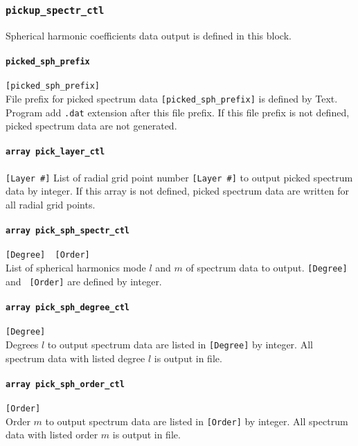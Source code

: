 %
\subsubsection{\tt pickup\_spectr\_ctl}
\label{href_t:pickup_spectr_ctl}
Spherical harmonic coefficients data output is defined in this block.

\paragraph{\tt picked\_sph\_prefix}
\label{href_t:picked_sph_prefix}
\verb|[picked_sph_prefix]| \\
File prefix for picked spectrum data \verb|[picked_sph_prefix]| is defined by Text. Program add {\tt .dat} extension after this file prefix. If this file prefix is not defined, picked spectrum data are not generated. 

\paragraph{\tt array pick\_layer\_ctl}
\label{href_t:pick_layer_ctl}
\verb|[Layer #]|
List of radial grid point number \verb|[Layer #]| to output picked spectrum data by integer. If this array is not defined, picked spectrum data are written for all radial grid points.

\paragraph{\tt array pick\_sph\_spectr\_ctl}
\label{href_t:pick_sph_spectr_ctl}
\verb|[Degree]  [Order]| \\
List of spherical harmonics mode $l$ and $m$ of spectrum data to output. \verb|[Degree]| and \verb| [Order]| are defined by integer.

\paragraph{\tt array pick\_sph\_degree\_ctl}
\label{href_t:pick_sph_degree_ctl}
\verb|[Degree]| \\
Degrees $l$ to output spectrum data are listed in \verb|[Degree]| by integer. All spectrum data with listed degree $l$ is output in file.

\paragraph{\tt array pick\_sph\_order\_ctl}
\label{href_t:pick_sph_order_ctl}
\verb|[Order]| \\
Order $m$ to output spectrum data are listed in \verb|[Order]| by integer. All spectrum data with listed order $m$ is output in file.



